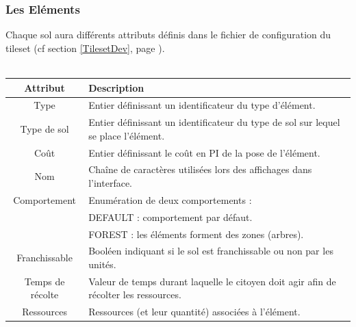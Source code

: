 \documentclass[a4paper]{article}
\newcommand{\alinea}{\hspace*{0.5cm}}
\begin{document}
        \subsubsection{Les Eléments}
          \alinea Chaque sol aura différents attributs définis dans le fichier de configuration du tileset (cf section \ref{TilesetDev}, page \pageref{TilesetDev}).\\
          \\
	  	  \begin{small}
			\begin{tabular}{| c | l |}
			  \hline
			  \textbf{Attribut} & \textbf{Description}\\
			  \hline
			  Type & Entier définissant un identificateur du type d'élément.\\
			  \hline
			  Type de sol & Entier définissant un identificateur du type de sol sur lequel se place l'élément.\\
			  \hline
			  Coût & Entier définissant le coût en PI de la pose de l'élément.\\
			  \hline
			  Nom & Chaîne de caractères utilisées lors des affichages dans l'interface.\\
			  \hline
			  Comportement & Enumération de deux comportements :\\
			  & DEFAULT : comportement par défaut.\\
			  & FOREST : les éléments forment des zones (arbres).\\
			  \hline
			  Franchissable & Booléen indiquant si le sol est franchissable ou non par les unités.\\
			  \hline
			  Temps de récolte & Valeur de temps durant laquelle le citoyen doit agir afin de récolter les ressources.\\
			  \hline
			  Ressources & Ressources (et leur quantité) associées à l'élément.\\
			  \hline
			\end{tabular}
		  \end{small}
          
          
\end{document}
